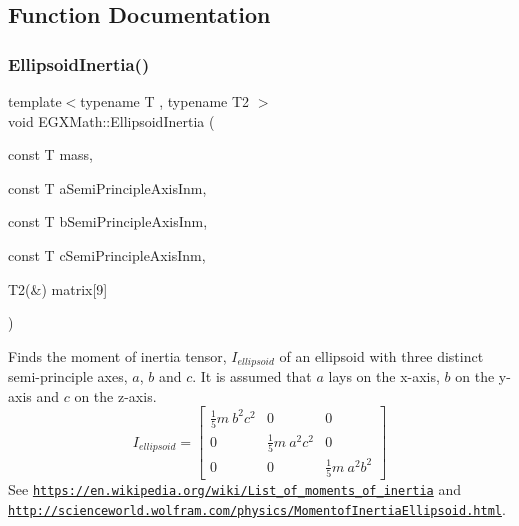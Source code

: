 \subsection{Function Documentation}
\mbox{\label{group___e_g_x_math-_geometry-3_d-_ellipsoid-_inertia_ga3b6f641f06037be75b8f51822eaa71bf}} 
\subsubsection{\texorpdfstring{Ellipsoid\+Inertia()}{EllipsoidInertia()}\hspace{0.1cm}{\footnotesize\ttfamily [1/3]}}
{\footnotesize\ttfamily template$<$typename T , typename T2 $>$ \\
void E\+G\+X\+Math\+::\+Ellipsoid\+Inertia (\begin{DoxyParamCaption}\item[{const T}]{mass,  }\item[{const T}]{a\+Semi\+Principle\+Axis\+Inm,  }\item[{const T}]{b\+Semi\+Principle\+Axis\+Inm,  }\item[{const T}]{c\+Semi\+Principle\+Axis\+Inm,  }\item[{T2(\&)}]{matrix\mbox{[}9\mbox{]} }\end{DoxyParamCaption})}



Finds the moment of inertia tensor, $I_{ellipsoid}$ of an ellipsoid with three distinct semi-\/principle axes, $a$, $b$ and $c$. It is assumed that $a$ lays on the x-\/axis, $b$ on the y-\/axis and $c$ on the z-\/axis. \[ I_{ellipsoid}=\begin{bmatrix} \frac{1}{5}m\ b^2c^2 & 0 & 0\\ 0 & \frac{1}{5}m\ a^2c^2 & 0\\ 0 & 0 & \frac{1}{5}m\ a^2b^2 \end{bmatrix} \] See \href{https://en.wikipedia.org/wiki/List_of_moments_of_inertia}{\tt https\+://en.\+wikipedia.\+org/wiki/\+List\+\_\+of\+\_\+moments\+\_\+of\+\_\+inertia} and \href{http://scienceworld.wolfram.com/physics/MomentofInertiaEllipsoid.html}{\tt http\+://scienceworld.\+wolfram.\+com/physics/\+Momentof\+Inertia\+Ellipsoid.\+html}. 


